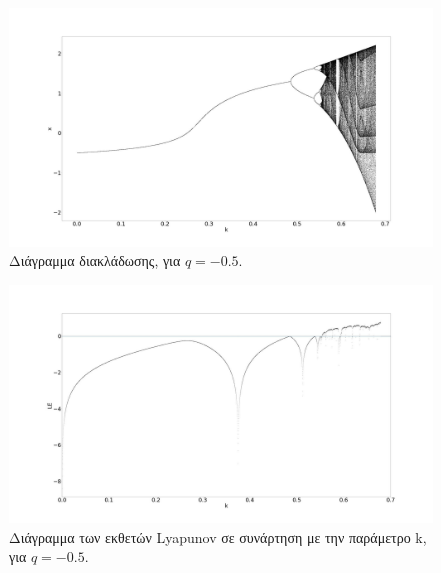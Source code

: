 \begin{figure}[ht]
	\centering
	\includegraphics[width=1\linewidth]{LateX images/graphs q05/g1}
	\caption{ Διάγραμμα διακλάδωσης, για $q=-0.5$.}
	\label{f:g10}
\end{figure}

\begin{figure}[ht]
	\centering
	\includegraphics[width=1\linewidth]{LateX images/graphs q05/g2}
	\caption{ Διάγραμμα των εκθετών Lyapunov σε συνάρτηση με την παράμετρο k, για $q=-0.5$.}
	\label{f:g11}
\end{figure}

